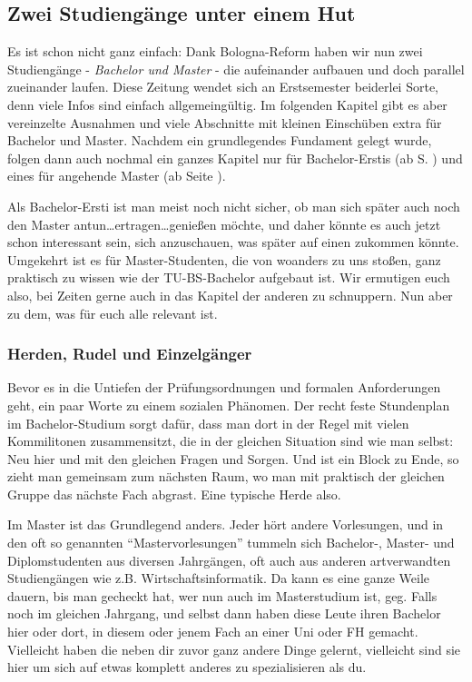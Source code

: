 \subsection{Zwei Studiengänge unter einem Hut}
Es ist schon nicht ganz einfach: Dank Bologna-Reform haben wir nun zwei Studiengänge - \textit{Bachelor und Master} - die aufeinander aufbauen und doch parallel zueinander laufen. Diese Zeitung wendet sich an Erstsemester beiderlei Sorte, denn viele Infos sind einfach allgemeingültig. Im folgenden Kapitel gibt es aber vereinzelte Ausnahmen und viele Abschnitte mit kleinen Einschüben extra für Bachelor und Master. Nachdem ein grundlegendes Fundament gelegt wurde, folgen dann auch nochmal ein ganzes Kapitel nur für Bachelor-Erstis (ab S. \pageref{bachelor}) und eines für angehende Master (ab Seite \pageref{master}).

Als Bachelor-Ersti ist man meist noch nicht sicher, ob man sich später auch noch den Master antun\ldots ertragen\ldots genießen möchte, und daher könnte es auch jetzt schon interessant sein, sich anzuschauen, was später auf einen zukommen könnte. Umgekehrt ist es für Master-Studenten, die von woanders zu uns stoßen, ganz praktisch zu wissen wie der TU-BS-Bachelor aufgebaut ist. Wir ermutigen euch also, bei Zeiten gerne auch in das Kapitel der anderen zu schnuppern. Nun aber zu dem, was für euch alle relevant ist.

\subsubsection{Herden, Rudel und Einzelgänger}
Bevor es in die Untiefen der Prüfungsordnungen und formalen Anforderungen geht, ein paar Worte zu einem sozialen Phänomen. Der recht feste Stundenplan im Bachelor-Studium sorgt dafür, dass man dort in der Regel mit vielen Kommilitonen zusammensitzt, die in der gleichen Situation sind wie man selbst: Neu hier und mit den gleichen Fragen und Sorgen. Und ist ein Block zu Ende, so zieht man gemeinsam zum nächsten Raum, wo man mit praktisch der gleichen Gruppe das nächste Fach abgrast. Eine typische Herde also.

Im Master ist das Grundlegend anders. Jeder hört andere Vorlesungen, und in den oft so genannten "`Mastervorlesungen"' tummeln sich Bachelor-, Master- und Diplomstudenten aus diversen Jahrgängen, oft auch aus anderen artverwandten Studiengängen wie z.B. Wirtschaftsinformatik. Da kann es eine ganze Weile dauern, bis man gecheckt hat, wer nun auch im Masterstudium ist, geg. Falls noch im gleichen Jahrgang, und selbst dann haben diese Leute ihren Bachelor hier oder dort, in diesem oder jenem Fach an einer Uni oder FH gemacht. Vielleicht haben die neben dir zuvor ganz andere Dinge gelernt, vielleicht sind sie hier um sich auf etwas komplett anderes zu spezialisieren als du.

